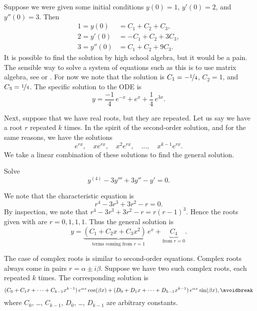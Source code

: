 \begin{example}
Suppose we were given some initial conditions $y(0) = 1$, $y'(0) = 2$,
and $y''(0) = 3$.  Then
\begin{equation*}
\begin{aligned}
1 = y(0) & = C_1 + C_2 + C_3 , \\
2 = y'(0) & = -C_1 + C_2 + 3C_3 , \\
3 = y''(0) & = C_1 + C_2 + 9C_3 .
\end{aligned}
\end{equation*}
It is possible to find the solution by high school algebra, but it would be a
pain.
The sensible way to solve a system of equations such as this is to use
matrix algebra, see
 or .
For now we note that the solution is $C_1 =
-\nicefrac{1}{4}$,
$C_2 = 1$, and $C_3 = \nicefrac{1}{4}$.  The specific solution
to the ODE is
\begin{equation*}
y = \frac{-1}{4}\, e^{-x} + e^x + \frac{1}{4}\, e^{3x} .
\end{equation*}
\end{example}

Next, suppose that we have real roots, but they are repeated.  Let us say
we have
a root $r$ repeated $k$ times.  In the spirit of the second-order
solution, and for the same reasons, we have the solutions
\begin{equation*}
e^{rx}, \quad xe^{rx}, \quad x^2 e^{rx}, \quad \ldots, \quad x^{k-1} e^{rx} .
\end{equation*}
We take a linear combination of these solutions to find the general
solution.

\begin{example}
Solve
\begin{equation*}
y^{(4)} - 3 y''' + 3 y'' - y' =  0 .
\end{equation*}

We note that the characteristic equation is
\begin{equation*}
r^4 - 3r^3 + 3r^2 -r = 0 .
\end{equation*}
By inspection, we note that $r^4 - 3r^3 + 3r^2 -r = r{(r-1)}^3$.  Hence
the roots given with  are $r = 0, 1, 1, 1$.  Thus the general
solution is
\begin{equation*}
y = \underbrace{(C_1 + C_2 x + C_3 x^2)\, e^x}_{\text{terms coming from }
r=1} + \underbrace{C_4}_{\text{from } r=0} .
\end{equation*}
\end{example}

The case of complex roots is similar
to second-order equations.
Complex roots
always come in pairs $r = \alpha \pm i \beta$.  Suppose we have
two such complex roots, each repeated $k$ times.
The corresponding solution is
\begin{equation*}
( C_0 + C_1 x + \cdots + C_{k-1} x^{k-1} ) \, e^{\alpha x} \cos (\beta x)
+
( D_0 + D_1 x + \cdots + D_{k-1} x^{k-1} ) \, e^{\alpha x} \sin (\beta x) ,
\avoidbreak
\end{equation*}
where $C_0$, \ldots, $C_{k-1}$, $D_0$, \ldots, $D_{k-1}$ are arbitrary
constants.

